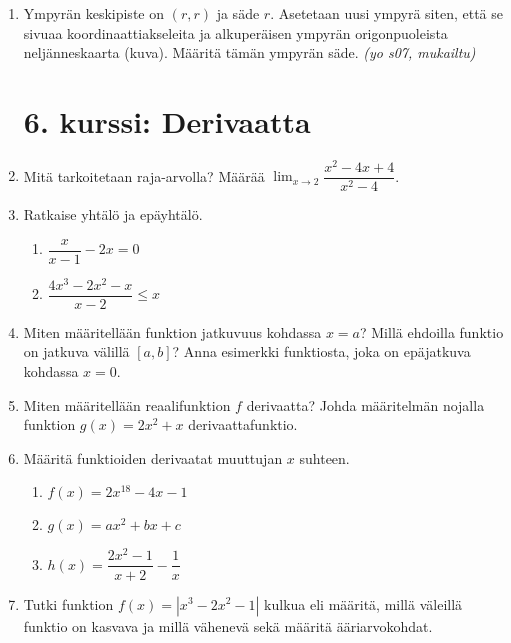 \documentclass[12pt,fleqn]{article}
\begin{document}
\begin{enumerate}[label=\textbf{\arabic*.}]
\item Ympyrän keskipiste on \((r,r)\) ja säde \(r\). Asetetaan uusi ympyrä siten, että se sivuaa koordinaattiakseleita ja alkuperäisen ympyrän origonpuoleista neljänneskaarta (kuva). Määritä tämän ympyrän säde. \emph{(yo s07, mukailtu)}


\newpage
\section*{6. kurssi: Derivaatta}
\item Mitä tarkoitetaan raja-arvolla? Määrää \(\displaystyle \lim_{x\to 2} \dfrac{x^2-4x+4}{x^2-4}\).

\item Ratkaise yhtälö ja epäyhtälö.
\begin{enumerate}[label=\textbf{\alph*)}]
\item \(\dfrac{x}{x-1}-2x=0\)
\item \(\dfrac{4x^3-2x^2-x}{x-2}\leq x\)
\end{enumerate}

\item Miten määritellään funktion jatkuvuus kohdassa \(x=a\)? Millä ehdoilla funktio on jatkuva välillä \([a,b]\)? Anna esimerkki funktiosta, joka on epäjatkuva kohdassa \(x=0\).

\item Miten määritellään reaalifunktion \(f\) derivaatta? Johda määritelmän nojalla funktion \(g(x)=2x^2+x\) derivaattafunktio.

\item Määritä funktioiden derivaatat muuttujan \(x\) suhteen.
\begin{enumerate}[label=\textbf{\alph*)}]
\item \(f(x)=2x^{18}-4x-1\)
\item \(g(x)=ax^2+bx+c\)
\item \(h(x)=\dfrac{2x^2-1}{x+2}-\dfrac{1}{x}\)
\end{enumerate}

\item Tutki funktion \(f(x)=|x^3-2x^2-1|\) kulkua eli määritä, millä väleillä funktio on kasvava ja millä vähenevä sekä määritä ääriarvokohdat.


\end{enumerate}
\end{document}
